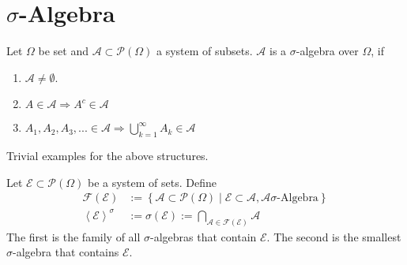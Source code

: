 \section{\(\sigma\)-Algebra}
\begin{definition}
    Let \(\Omega\) be set and \(\mathcal{A} \subset \mathcal{P}(\Omega)\) a system of subsets. \(\mathcal{A}\) is a \(\sigma\)-algebra over \(\Omega\), if
        \begin{enumerate}
            \item \(\mathcal{A} \neq \emptyset\).
            \item \(A \in \mathcal{A} \Rightarrow A^c \in \mathcal{A}\)
            \item \(A_1, A_2, A_3, ... \in \mathcal{A} \Rightarrow \bigcup_{k=1}^\infty A_k \in \mathcal{A}\)
        \end{enumerate}
\end{definition}
\begin{example}
    Trivial examples for the above structures.
\end{example}
\begin{definition}
    Let \(\mathcal{E} \subset \mathcal{P}(\Omega)\) be a system of sets. Define
    \begin{align}
        \mathcal{F}(\mathcal{E}) &:= \left\{ \mathcal{A} \subset \mathcal{P}(\Omega) \middle| \mathcal{E} \subset \mathcal{A}, \mathcal{A} \sigma\text{-Algebra} \right\} \\
        \left< \mathcal{E}  \right>^{\sigma} &:= \sigma(\mathcal{E}) := \bigcap_{\mathcal{A} \in \mathcal{F}(\mathcal{E})} \mathcal{A}
    \end{align}
    The first is the family of all \(\sigma\)-algebras that contain \(\mathcal{E}\).
    The second is the smallest \(\sigma\)-algebra that contains \(\mathcal{E}\).
\end{definition}
%
%
%
%
%
